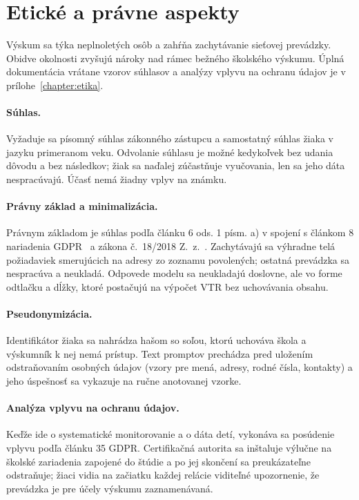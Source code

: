 \section{Etické a právne aspekty}
\label{sec:etika}

Výskum sa týka neplnoletých osôb a zahŕňa zachytávanie sieťovej prevádzky. Obidve okolnosti zvyšujú nároky nad rámec bežného školského výskumu. Úplná dokumentácia vrátane vzorov súhlasov a analýzy vplyvu na ochranu údajov je v prílohe~\ref{chapter:etika}.

\paragraph{Súhlas.} Vyžaduje sa písomný súhlas zákonného zástupcu a samostatný súhlas žiaka v jazyku primeranom veku. Odvolanie súhlasu je možné kedykoľvek bez udania dôvodu a bez následkov; žiak sa naďalej zúčastňuje vyučovania, len sa jeho dáta nespracúvajú. Účasť nemá žiadny vplyv na známku.

\paragraph{Právny základ a minimalizácia.} Právnym základom je súhlas podľa článku 6 ods. 1 písm. a) v spojení s článkom 8 nariadenia GDPR~\cite{gdpr2016} a zákona č.~18/2018 Z.~z.~\cite{zakon18_2018}. Zachytávajú sa výhradne telá požiadaviek smerujúcich na adresy zo zoznamu povolených; ostatná prevádzka sa nespracúva a neukladá. Odpovede modelu sa neukladajú doslovne, ale vo forme odtlačku a dĺžky, ktoré postačujú na výpočet VTR bez uchovávania obsahu.

\paragraph{Pseudonymizácia.} Identifikátor žiaka sa nahrádza hašom so soľou, ktorú uchováva škola a výskumník k nej nemá prístup. Text promptov prechádza pred uložením odstraňovaním osobných údajov (vzory pre mená, adresy, rodné čísla, kontakty) a jeho úspešnosť sa vykazuje na ručne anotovanej vzorke.

\paragraph{Analýza vplyvu na ochranu údajov.} Keďže ide o systematické monitorovanie a o dáta detí, vykonáva sa posúdenie vplyvu podľa článku 35 GDPR. Certifikačná autorita sa inštaluje výlučne na školské zariadenia zapojené do štúdie a po jej skončení sa preukázateľne odstraňuje; žiaci vidia na začiatku každej relácie viditeľné upozornenie, že prevádzka je pre účely výskumu zaznamenávaná.

